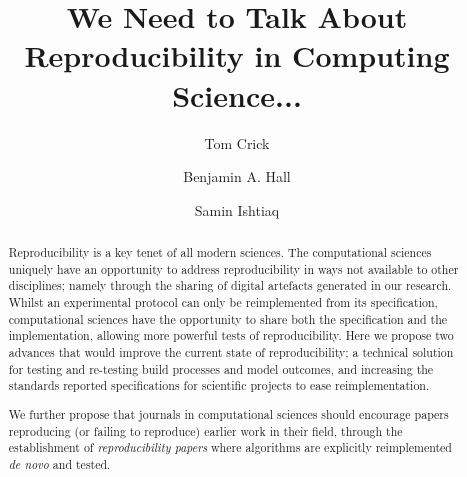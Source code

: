 \documentclass[a4paper,11pt]{article}
\begin{document}
\title{We Need to Talk About Reproducibility in Computing Science...}

\author[1]{Tom Crick}
\author[2]{Benjamin A. Hall}
\author[3]{Samin Ishtiaq}




\date{ }
\maketitle

\begin{abstract}
Reproducibility is a key tenet of all modern sciences. The computational
sciences uniquely have an opportunity to address reproducibility in ways
not available to other disciplines; namely through the sharing of digital
artefacts generated in our research. Whilst an experimental protocol can 
only be reimplemented from its specification, computational sciences
have the opportunity to share both the specification and the implementation,
allowing more powerful tests of reproducibility. Here we propose two advances
that would improve the current state of reproducibility; a technical solution
for testing and re-testing build processes and model outcomes, and increasing 
the standards reported specifications for scientific projects to ease 
reimplementation.

We further propose that journals in computational sciences should
encourage papers reproducing (or failing to reproduce) earlier work in
their field, through the establishment of \emph{reproducibility papers}
where algorithms are explicitly reimplemented \emph{de novo} and tested.
\end{abstract}
\end{document}
